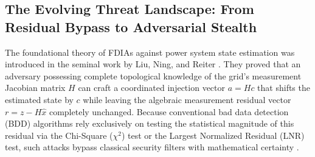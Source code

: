 \documentclass[journal,compsoc]{IEEEtran}
\begin{document}
\subsection{The Evolving Threat Landscape: From Residual Bypass to Adversarial Stealth}
The foundational theory of FDIAs against power system state estimation was introduced in the seminal work by Liu, Ning, and Reiter \cite{ref29}. They proved that an adversary possessing complete topological knowledge of the grid's measurement Jacobian matrix $H$ can craft a coordinated injection vector $a = Hc$ that shifts the estimated state by $c$ while leaving the algebraic measurement residual vector $r = z - H\hat{x}$ completely unchanged. Because conventional bad data detection (BDD) algorithms rely exclusively on testing the statistical magnitude of this residual via the Chi-Square ($\chi^2$) test or the Largest Normalized Residual (LNR) test, such attacks bypass classical security filters with mathematical certainty \cite{ref10, ref29}.
\end{document}
